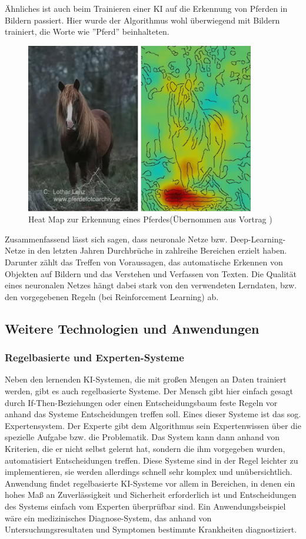 \documentclass[a4paper,12pt, german]{report}
\begin{document}
Ähnliches ist auch beim Trainieren einer KI auf die Erkennung von Pferden in Bildern passiert. Hier wurde der Algorithmus wohl überwiegend mit Bildern trainiert, die Worte wie ''Pferd'' beinhalteten. \cite{16}

\begin{figure}[H]
  \center
 \includegraphics[width=10cm]{images/Pferd-HeatMap.png}
  \caption[Heat Map zur Erkennung eines Pferdes]{Heat Map zur Erkennung eines Pferdes(Übernommen aus Vortrag \cite{16})}
\end{figure}

Zusammenfassend lässt sich sagen, dass neuronale Netze bzw. Deep-Learning-Netze in den letzten Jahren Durchbrüche in zahlreihe Bereichen erzielt haben. Darunter zählt das Treffen von Voraussagen, das automatische Erkennen von Objekten auf Bildern und das Verstehen und Verfassen von Texten. Die Qualität eines neuronalen Netzes hängt dabei stark von den verwendeten Lerndaten, bzw. den vorgegebenen Regeln (bei Reinforcement Learning) ab. 

\subsection{Weitere Technologien und Anwendungen}

\subsubsection{Regelbasierte und Experten-Systeme}

Neben den lernenden KI-Systemen, die mit großen Mengen an Daten trainiert werden, gibt es auch regelbasierte Systeme. Der Mensch gibt hier einfach gesagt durch If-Then-Beziehungen oder einen Entscheidungsbaum feste Regeln vor anhand das Systeme Entscheidungen treffen soll. Eines dieser Systeme ist das sog. Expertensystem. Der Experte gibt dem Algorithmus sein Expertenwissen über die spezielle Aufgabe bzw. die Problematik. Das System kann dann anhand von Kriterien, die er nicht selbst gelernt hat, sondern die ihm vorgegeben wurden, automatisiert Entscheidungen treffen. Diese Systeme sind in der Regel leichter zu implementieren, sie werden allerdings schnell sehr komplex und unübersichtlich.\cite{01}
Anwendung findet regelbasierte KI-Systeme vor allem in Bereichen, in denen ein hohes Maß an Zuverlässigkeit und Sicherheit erforderlich ist und Entscheidungen des Systems einfach vom Experten überprüfbar sind. 
Ein Anwendungsbeispiel wäre ein medizinisches Diagnose-System, das anhand von Untersuchungsresultaten und Symptomen bestimmte Krankheiten diagnostiziert.
\end{document}
